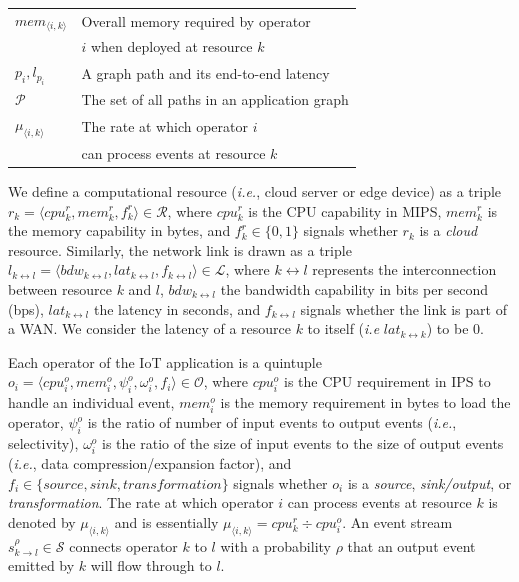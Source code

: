 \begin{table}[ht]
\begin{tabular}{ll}
    $mem_{\langle i,k\rangle}$ & Overall memory required by operator\\
    &  $i$ when deployed at resource $k$\\
    $p_i, l_{p_i}$ & A graph path and its end-to-end latency\\ 
    $\mathcal{P}$ & The set of all paths in an application graph\\
    $\mu_{\langle i,k\rangle}$ & The rate at which operator $i$ \\
    & can process events at resource $k$\\
    \bottomrule
\end{tabular} 
\end{table}


We define a computational resource (\textit{i.e.}, cloud server or edge device) as a triple $ r_k = \langle cpu_k^r, mem_k^r, f_k^r\rangle \in\mathcal{R}$, where $cpu_k^r$ is the CPU capability in \ac{MIPS}, $mem_k^r$ is the memory capability in bytes, and $f_k^r\in\{0, 1\}$ signals whether $r_k$ is a \textit{cloud} resource. Similarly, the network link is drawn as a triple $l_{k\leftrightarrow l}=\langle bdw_{k\leftrightarrow l},lat_{k\leftrightarrow l}, f_{k\leftrightarrow l}\rangle\in\mathcal{L}$, where $k\leftrightarrow l$ represents the interconnection between resource $k$ and $l$, $bdw_{k\leftrightarrow l}$ the bandwidth capability in bits per second (bps), $lat_{k\leftrightarrow l}$ the latency in seconds, and $f_{k\leftrightarrow l}$ signals whether the link is part of a WAN. We consider the latency of a resource $k$ to itself (\textit{i.e} $lat_{k\leftrightarrow k}$) to be $0$.  

Each operator of the \ac{IoT} application is a quintuple $o_i = \langle cpu_i^o, mem_i^o, \psi_i^o, \omega_i^o, f_i\rangle\in\mathcal{O}$, where $cpu_i^o$ is the CPU requirement in \ac{IPS} to handle an individual event, $mem_i^o$ is the memory requirement in bytes to load the operator, $\psi_i^o$ is the ratio of number of input events to output events (\emph{i.e.}, selectivity), $\omega_i^o$ is the ratio of the size of input events to the size of output events (\emph{i.e.}, data compression/expansion factor), and $f_i\in\{source,sink,transformation\}$ signals whether $o_i$ is a \textit{source}, \textit{sink/output}, or \textit{transformation}. The rate at which operator $i$ can process events at resource $k$ is denoted by $\mu_{\langle i,k\rangle}$ and is essentially $\mu_{\langle i,k\rangle} = cpu_k^r\div cpu_i^o$. An event stream $s_{k\rightarrow l}^{\rho}\in\mathcal{S}$ connects operator $k$ to $l$ with a probability $\rho$ that an output event emitted by $k$ will flow through to $l$.

